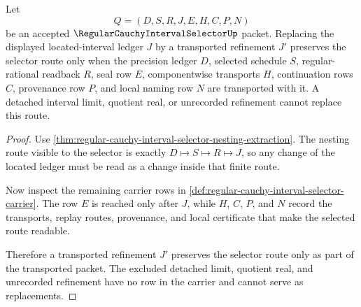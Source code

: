 \begin{theorem}
\label{thm:regular-cauchy-interval-selector-located-nesting-transport}
Let
$$
Q=(D,S,R,J,E,H,C,P,N)
$$
be an accepted $\RegularCauchyIntervalSelectorUp$ packet. Replacing the displayed located-interval ledger $J$ by a transported refinement $J'$ preserves the selector route only when the precision ledger $D$, selected schedule $S$, regular-rational readback $R$, seal row $E$, componentwise transports $H$, continuation rows $C$, provenance row $P$, and local naming row $N$ are transported with it. A detached interval limit, quotient real, or unrecorded refinement cannot replace this route.
\end{theorem}
\begin{proof}
Use \autoref{thm:regular-cauchy-interval-selector-nesting-extraction}. The nesting route visible to the selector is exactly $D \mapsto S \mapsto R \mapsto J$, so any change of the located ledger must be read as a change inside that finite route.

Now inspect the remaining carrier rows in \autoref{def:regular-cauchy-interval-selector-carrier}. The row $E$ is reached only after $J$, while $H$, $C$, $P$, and $N$ record the transports, replay routes, provenance, and local certificate that make the selected route readable.

Therefore a transported refinement $J'$ preserves the selector route only as part of the transported packet. The excluded detached limit, quotient real, and unrecorded refinement have no row in the carrier and cannot serve as replacements.
\end{proof}

